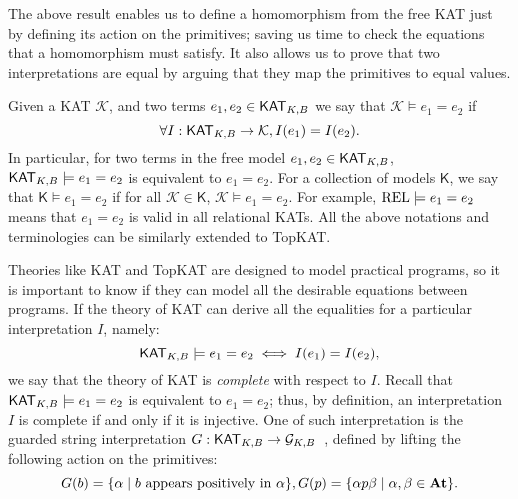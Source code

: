 The above result enables us to define a homomorphism from the free KAT just by
defining its action on the primitives; saving us time to check the equations
that a homomorphism must satisfy.  It also allows us to prove that two
interpretations are equal by arguing that they map the primitives to
equal values.

Given a KAT \(\mathcal{K}\), and two terms \(e_1, e_2  \in  \mathsf{KAT}_{K, B}\) we say that \(\mathcal{K}  \models  e_1 = e_2\) if
\[ \forall  I : \mathsf{KAT}_{K, B}  \to  \mathcal{K}, I(e_1) = I(e_2).\] In particular, 
for two terms in the free model \(e_1, e_2  \in  \mathsf{KAT}_{K, B}\),
\(\mathsf{KAT}_{K, B}  \models  e_1 = e_2\) is equivalent to \(e_1 = e_2\).  
For a collection of models \(\mathsf{K}\), 
we say that \(\mathsf{K}  \models  e_1 = e_2\) if for all \(\mathcal{K}  \in  \mathsf{K}\),
\(\mathcal{K}  \models  e_1 = e_2\).  For example, \(\mathbf{\mathrm{REL}}  \models  e_1 = e_2\) means that \(e_1 = e_2\) is
valid in all relational KATs.  All the above notations and terminologies can be
similarly extended to TopKAT.

Theories like KAT and TopKAT are designed to model practical
programs, so it is important to know if they can model all the desirable
equations between programs. If the theory of KAT can derive all the equalities
for a particular interpretation \(I\), namely:
\[\mathsf{KAT}_{K, B}  \models  e_1 = e_2  \iff  I(e_1) = I(e_2),\]
we say that the theory of KAT is \emph{complete} with respect to \(I\).
Recall that \(\mathsf{KAT}_{K, B}  \models  e_1 = e_2\) is equivalent to \(e_1 = e_2\);  
thus, by definition, an interpretation \(I\) is complete if and only if it is injective.
One of such interpretation is the guarded string interpretation
\(G: \mathsf{KAT}_{K, B}  \to  \mathcal{G}_{K, B}\)~\cite{Kozen_Smith_1997},
defined by lifting the following action on the primitives:
\[
    G(b) = \{ \alpha   \mid  \text{\(b\) appears positively in \( \alpha \)}\}, \\
    G(p) = \{ \alpha  p  \beta   \mid   \alpha ,  \beta   \in  \mathbf{At}\}.
\]



